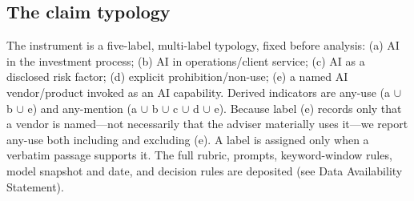 \documentclass[utf8]{FrontiersinHarvard}
\begin{document}
\subsection{The claim typology}
The instrument is a five-label, multi-label typology, fixed before analysis: (a) AI in the investment process; (b) AI in operations/client service; (c) AI as a disclosed risk factor; (d) explicit prohibition/non-use; (e) a named AI vendor/product invoked as an AI capability. Derived indicators are any-use (a $\cup$ b $\cup$ e) and any-mention (a $\cup$ b $\cup$ c $\cup$ d $\cup$ e). Because label (e) records only that a vendor is named---not necessarily that the adviser materially uses it---we report any-use both including and excluding (e). A label is assigned only when a verbatim passage supports it. The full rubric, prompts, keyword-window rules, model snapshot and date, and decision rules are deposited (see Data Availability Statement).
\end{document}
